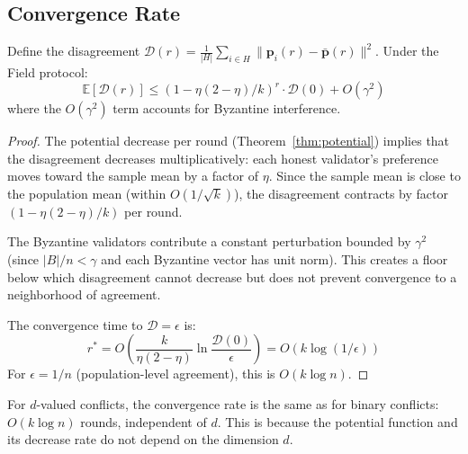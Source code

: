\subsection{Convergence Rate}

\begin{lemma}
\label{lem:convergence-rate}
Define the disagreement $\mathcal{D}(r) = \frac{1}{|H|}\sum_{i \in H} \|\mathbf{p}_i(r) - \bar{\mathbf{p}}(r)\|^2$.
Under the Field protocol:
\[
\mathbb{E}[\mathcal{D}(r)] \leq (1 - \eta(2-\eta)/k)^r \cdot \mathcal{D}(0) + O(\gamma^2)
\]
where the $O(\gamma^2)$ term accounts for Byzantine interference.
\end{lemma}

\begin{proof}
The potential decrease per round (Theorem~\ref{thm:potential}) implies that the disagreement
decreases multiplicatively: each honest validator's preference moves toward the sample mean
by a factor of $\eta$. Since the sample mean is close to the population mean (within $O(1/\sqrt{k})$),
the disagreement contracts by factor $(1 - \eta(2-\eta)/k)$ per round.

The Byzantine validators contribute a constant perturbation bounded by $\gamma^2$ (since
$|B|/n < \gamma$ and each Byzantine vector has unit norm). This creates a floor below
which disagreement cannot decrease but does not prevent convergence to a neighborhood of
agreement.

The convergence time to $\mathcal{D} = \epsilon$ is:
\[
r^* = O\left(\frac{k}{\eta(2-\eta)} \ln \frac{\mathcal{D}(0)}{\epsilon}\right) = O(k \log(1/\epsilon))
\]
For $\epsilon = 1/n$ (population-level agreement), this is $O(k \log n)$.
\end{proof}

\begin{corollary}
\label{cor:multi}
For $d$-valued conflicts, the convergence rate is the same as for binary conflicts:
$O(k \log n)$ rounds, independent of $d$. This is because the potential function and
its decrease rate do not depend on the dimension $d$.
\end{corollary}

